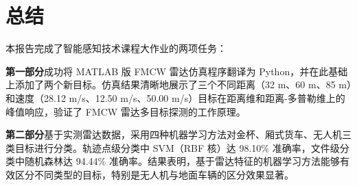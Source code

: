 \documentclass[12pt,a4paper]{ctexart}
\begin{document}
\section{总结}

本报告完成了智能感知技术课程大作业的两项任务：

\textbf{第一部分}成功将 MATLAB 版 FMCW 雷达仿真程序翻译为 Python，并在此基础上添加了两个新目标。仿真结果清晰地展示了三个不同距离（32 m、60 m、85 m）和速度（28.12 m/s、12.50 m/s、50.00 m/s）目标在距离维和距离-多普勒维上的峰值响应，验证了 FMCW 雷达多目标探测的工作原理。

\textbf{第二部分}基于实测雷达数据，采用四种机器学习方法对金杯、厢式货车、无人机三类目标进行分类。轨迹点级分类中 SVM（RBF 核）达 98.10\% 准确率，文件级分类中随机森林达 94.44\% 准确率。结果表明，基于雷达特征的机器学习方法能够有效区分不同类型的目标，特别是无人机与地面车辆的区分效果显著。
\end{document}
